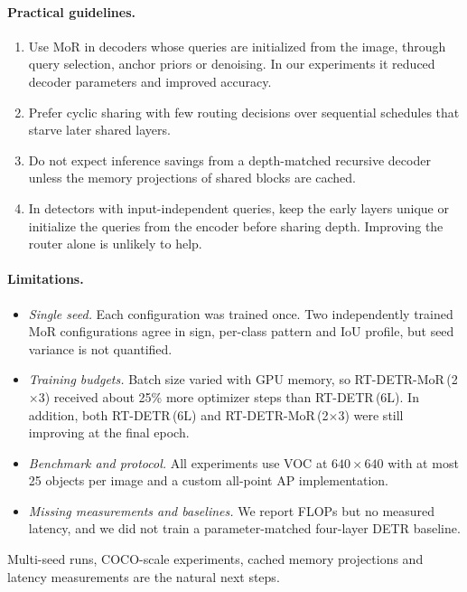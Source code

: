 \documentclass[pdflatex,iicol,sn-basic,Numbered]{sn-jnl}
\newcommand{\x}{\ensuremath{\times}}
\newcommand{\rtsix}{RT-DETR\,(6L)}
\newcommand{\rtA}{RT-DETR-MoR\,(2\x3)}
\begin{document}
\paragraph{Practical guidelines.}
\begin{enumerate}
\item Use MoR in decoders whose queries are initialized from the image, through query selection, anchor priors or denoising. In our experiments it reduced decoder parameters and improved accuracy.
\item Prefer cyclic sharing with few routing decisions over sequential schedules that starve later shared layers.
\item Do not expect inference savings from a depth-matched recursive decoder unless the memory projections of shared blocks are cached.
\item In detectors with input-independent queries, keep the early layers unique or initialize the queries from the encoder before sharing depth. Improving the router alone is unlikely to help.
\end{enumerate}

\paragraph{Limitations.}
\begin{itemize}
\item \emph{Single seed.} Each configuration was trained once. Two independently trained MoR configurations agree in sign, per-class pattern and IoU profile, but seed variance is not quantified.
\item \emph{Training budgets.} Batch size varied with GPU memory, so \rtA{} received about 25\% more optimizer steps than \rtsix{}. In addition, both \rtsix{} and \rtA{} were still improving at the final epoch.
\item \emph{Benchmark and protocol.} All experiments use VOC at $640\times640$ with at most 25 objects per image and a custom all-point AP implementation.
\item \emph{Missing measurements and baselines.} We report FLOPs but no measured latency, and we did not train a parameter-matched four-layer DETR baseline.
\end{itemize}
Multi-seed runs, COCO-scale experiments, cached memory projections and latency measurements are the natural next steps.

\end{document}
